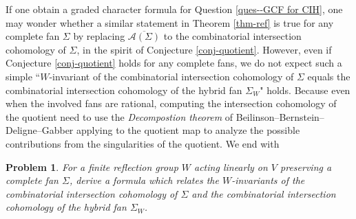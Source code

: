 \documentclass{amsart}
\newtheorem{problem}[theorem]{Problem}
\theoremstyle{definition}
\theoremstyle{remark}
\numberwithin{equation}{section}
\begin{document}
If one obtain a graded character formula for Question \ref{ques--GCF for CIH}, one may wonder whether a similar statement in Theorem \ref{thm-ref} is true for any complete fan $\Sigma$ by replacing $\overline{\mathcal{A}(\Sigma)}$ to the combinatorial intersection cohomology of $\Sigma$, in the spirit of Conjecture \ref{conj-quotient}. However, even if Conjecture \ref{conj-quotient} holds for any complete fans, we do not expect such a simple ``$W$-invariant of the combinatorial intersection cohomology of $\Sigma$ equals the combinatorial intersection cohomology of the hybrid fan $\Sigma_W$" holds. Because even when the involved fans are
rational, computing the intersection cohomology of the quotient need to use the \emph{Decompostion theorem} of Beilinson--Bernstein--Deligne--Gabber\cite{beilinson2018faisceaux} applying to the quotient map to analyze the possible contributions from the singularities of the quotient. We end with 

\begin{problem}
  For a finite reflection group $W$ acting linearly on $V$ preserving a complete fan $\Sigma$, derive a formula which relates  the $W$-invariants of the combinatorial intersection cohomology of $\Sigma$ and the combinatorial intersection cohomology of the hybrid fan $\Sigma_W$.
\end{problem}


\end{document}
